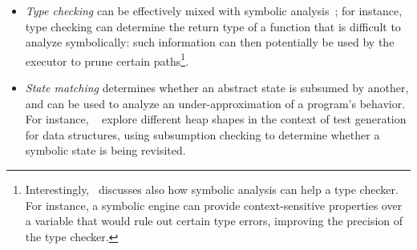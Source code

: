\begin{itemize}
  \item {\em Type checking} can be effectively mixed with symbolic analysis~\cite{KCF-PLDI10};  for instance, type checking can determine the return type of a function that is difficult to analyze symbolically: such information can then potentially be used by the executor to prune certain paths\footnote{Interestingly,~\cite{KCF-PLDI10} discusses also how symbolic analysis can help a type checker. For instance, a symbolic engine can provide context-sensitive properties over a variable that would rule out certain type errors, improving the precision of the type checker.}.

  \item {\em State matching} determines whether an abstract state is subsumed by another, and can be used to analyze an under-approximation of a program's behavior. For instance, ~\cite{APV-SPIN06,VPP-ISSTA06} explore different heap shapes in the context of test generation for data structures, using subsumption checking to determine whether a symbolic state is being revisited. %

\end{itemize}

